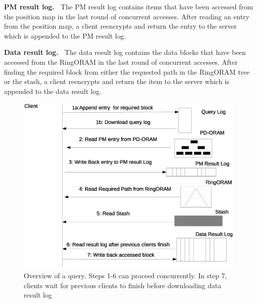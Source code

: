 {\bf PM result log.~}
%
The PM result log contains items that have been accessed from the position map 
in the last round of concurrent accesses. After reading an entry from the 
position map, a client reencrypts and return the entry to the server which is appended to the PM 
result log. 

{\bf Data result log.~}
%
The data result log contains the data blocks that have been accessed from the 
RingORAM in the last round of concurrent accesses. After finding the required block from either 
the requested path in the RingORAM tree or the stash, 
a client reencrypts and return the item to the server which is appended to the data 
result log.


\begin{figure}
 \includegraphics[scale=0.30]{Figures/Query_overview.eps}
 \caption{Overview of a query. Steps 1-6 can proceed concurrently. In step 7, clients wait for previous clients to finish before downloading
 data result log \label{query_overview}}
\end{figure}


